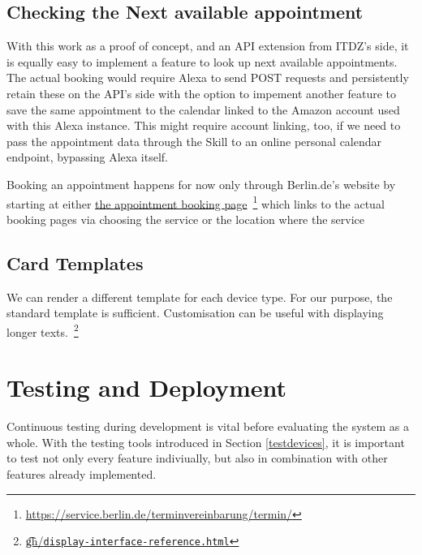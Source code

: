 \subsection*{Checking the Next available appointment}

With this work as a proof of concept, and an API extension from ITDZ's side, it is equally easy to implement a feature to look up next available appointments.
The actual booking would require Alexa to send POST requests and persistently retain these on the API's side with the option to impement another feature to save the same appointment to the calendar linked to the Amazon account used with this Alexa instance. This might require account linking, too, if we need to pass the appointment data through the Skill to an online personal calendar endpoint, bypassing Alexa itself.

Booking an appointment happens for now only through Berlin.de's website by starting at either \href{https://service.berlin.de/terminvereinbarung/termin/}{the appointment booking page}~\footnote{\url{https://service.berlin.de/terminvereinbarung/termin/}} which links to the actual booking pages via choosing the service or the location where the service 



\subsection*{Card Templates}

We can render a different template for each device type. For our purpose, the standard template is sufficient. Customisation can be useful with displaying longer texts.~\footnote{\href{https://developer.amazon.com/docs/custom-skills/display-interface-reference.html}{\t{gh}/\texttt{display-interface-reference.html}}}

%


\section{Testing and Deployment}

Continuous testing during development is vital before evaluating the system as a whole. %
With the testing tools introduced in Section \ref{testdevices}, it is important to test not only every feature indiviually, but also in combination with other features already implemented.



